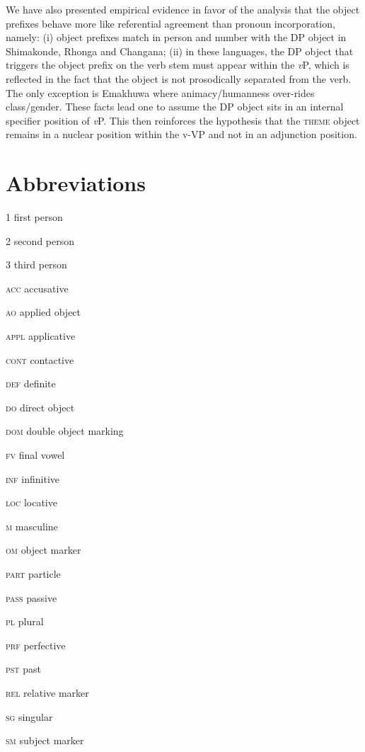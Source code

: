 \documentclass[output=paper]{langsci/langscibook}
\begin{document}
We have also presented empirical evidence in favor of the analysis that the object prefixes behave more like referential agreement than pronoun incorporation, namely: (i) object prefixes match in person and number with the DP object in Shimakonde, Rhonga and Changana; (ii) in these languages, the DP object that triggers the object prefix on the verb stem must appear within the \textit{v}P, which is reflected in the fact that the object is not prosodically separated from the verb. The only exception is Emakhuwa where animacy/humanness over-rides class/gender. These facts lead one to assume the DP object sits in an internal specifier position of \textit{v}P. This then reinforces the hypothesis that the \textsc{theme} object remains in a nuclear position within the v-VP and not in an adjunction position.

\section {Abbreviations}

{\textsc{1  }}{first person}

{\textsc{2  }}{second person}

{\textsc{3  }}{third person}

{\textsc{acc  }}{accusative}

{\textsc{ao  }}applied object

{\textsc{appl  }}{applicative}

{\textsc{cont}}  {contactive}

{\textsc{def  }}{definite}

{\textsc{do  }}direct object

\textsc{dom}  double object marking

{\textsc{fv  }}final vowel

{\textsc{inf  }}infinitive

{\textsc{loc}}  locative

{\textsc{m  }}masculine

{\textsc{om  }}object marker

{\textsc{part  }}particle

{\textsc{pass  }}passive

{\textsc{pl  }}plural

{\textsc{prf  }}perfective

{\textsc{pst  }}past

{\textsc{rel}}  relative marker

{\textsc{sg  }}singular

{\textsc{sm  }}subject marker
\end{document}
